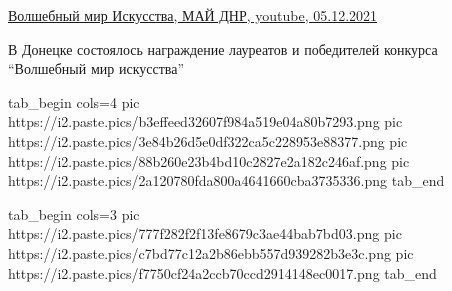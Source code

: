  
 
 
 
 

\href{https://www.youtube.com/watch?v=rDTZfDmAYd8&t=513s}{%
Волшебный мир Искусства, МАЙ ДНР, youtube, 05.12.2021%
}

В Донецке состоялось награждение лауреатов и победителей конкурса
\enquote{Волшебный мир искусства}

\ifcmt
  tab_begin cols=4
		 pic https://i2.paste.pics/b3effeed32607f984a519e04a80b7293.png
		 pic https://i2.paste.pics/3e84b26d5e0df322ca5c228953e88377.png
		 pic https://i2.paste.pics/88b260e23b4bd10c2827e2a182c246af.png
		 pic https://i2.paste.pics/2a120780fda800a4641660cba3735336.png
  tab_end

  tab_begin cols=3
		 pic https://i2.paste.pics/777f282f2f13fe8679c3ae44bab7bd03.png
		 pic https://i2.paste.pics/c7bd77c12a2b86ebb557d939282b3e3c.png
		 pic https://i2.paste.pics/f7750cf24a2ccb70ccd2914148ec0017.png
  tab_end
\fi
